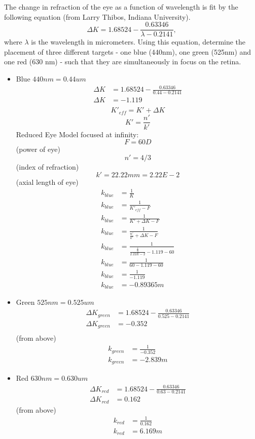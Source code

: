 \documentclass{article}
\begin{document}
\begin{enumerate}[1.]
\begin{item}
\end{item}
\begin{item}
The change in refraction of the eye as a function of wavelength is fit by the following equation (from Larry Thibos, Indiana University). $$\Delta K = 1.68524 - \frac{0.63346}{\lambda - 0.2141},$$ where $\lambda$ is the wavelength in micrometers. Using this equation, determine the placement of three different targets - one blue (440nm), one green (525nm) and one red (630 nm) - such that they are simultaneously in focus on the retina.

\begin{itemize}
\item Blue $440nm = 0.44um$
\begin{align*}
\Delta K &= 1.68524 - \frac{0.63346}{0.44 - 0.2141} \\
\Delta K &= - 1.119 \\
\end{align*}
$$K'_{eff} = K' + \Delta K$$
$$K' = \frac{n'}{k'}$$
Reduced Eye Model focused at infinity:
$$F = 60D$$ (power of eye)
$$n' = 4/3$$ (index of refraction)
$$k' = 22.22mm = 2.22E-2 $$ (axial length of eye)
\begin{align*}
k_{blue} &= \frac{1}{K} \\
k_{blue} &= \frac{1}{K'_{eff}-F} \\
k_{blue} &= \frac{1}{K'+\Delta K - F} \\
k_{blue} &= \frac{1}{\frac{n'}{k'} + \Delta K - F} \\
k_{blue} &= \frac{1}{\frac{\frac{4}{3}}{2.22E-2} -1.119 - 60} \\
k_{blue} &= \frac{1}{60 -1.119 - 60} \\
k_{blue} &= \frac{1}{-1.119} \\
k_{blue} &= -0.89365m 
\end{align*}

\item Green $525nm = 0.525um$
\begin{align*}
\Delta K_{green} &= 1.68524 - \frac{0.63346}{0.525 - 0.2141} \\
\Delta K_{green} &= - 0.352 \\
\end{align*}
(from above)
\begin{align*}
k_{green} &= \frac{1}{-0.352} \\
k_{green} &= -2.839m 
\end{align*}

\item Red $630nm = 0.630um$
\begin{align*}
\Delta K_{red} &= 1.68524 - \frac{0.63346}{0.63 - 0.2141} \\
\Delta K_{red} &= 0.162
\end{align*}
(from above)
\begin{align*}
k_{red} &= \frac{1}{0.162} \\
k_{red} &= 6.169m
\end{align*}


\end{itemize}
\end{item}
\end{enumerate}
\end{document}
